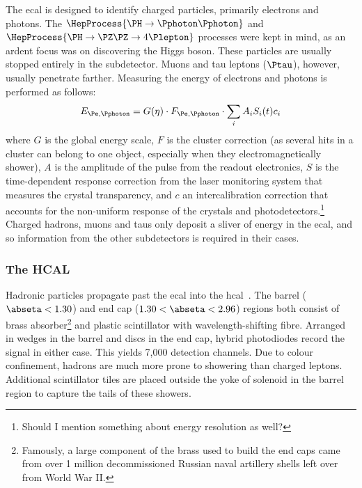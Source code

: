 The \acrshort{ecal} is designed to identify charged particles, primarily electrons and photons. The $\HepProcess{\PH \to \Pphoton\Pphoton}$ and $\HepProcess{\PH \to \PZ\PZ \to 4\Plepton}$ processes were kept in mind, as an ardent focus was on discovering the Higgs boson. These particles are usually stopped entirely in the subdetector. Muons and tau leptons ($\Ptau$), however, usually penetrate farther. Measuring the energy of electrons and photons is performed as follows:
\begin{equation}
    E_{\Pe, \Pphoton} = G(\eta) \cdot F_{\Pe, \Pphoton} \cdot \sum_i A_i S_i(t) c_i
    \label{eq:ecal_energy}
\end{equation}
where $G$ is the global energy scale, $F$ is the cluster correction (as several hits in a cluster can belong to one object, especially when they electromagnetically shower), $A$ is the amplitude of the pulse from the readout electronics, $S$ is the time-dependent response correction from the laser monitoring system that measures the crystal transparency, and $c$ an intercalibration correction that accounts for the non-uniform response of the crystals and photodetectors.\footnote{Should I mention something about energy resolution as well?} Charged hadrons, muons and taus only deposit a sliver of energy in the \acrshort{ecal}, and so information from the other subdetectors is required in their cases. 




\subsubsection{The HCAL}
\label{subsubsec:cms_hcal}

Hadronic particles propagate past the \acrshort{ecal} into the \acrshort{hcal}~\cite{CERN-LHCC-97-031}. The barrel ($\abseta < \text{1.30}$) and end cap ($\text{1.30} < \abseta < \text{2.96}$) regions both consist of brass absorber\footnote{Famously, a large component of the brass used to build the end caps came from over 1 million decommissioned Russian naval artillery shells left over from World War II.} and plastic scintillator with wavelength-shifting fibre. Arranged in wedges in the barrel and discs in the end cap, hybrid photodiodes record the signal in either case. This yields 7,000 detection channels. Due to colour confinement, hadrons are much more prone to showering than charged leptons. Additional scintillator tiles are placed outside the yoke of solenoid in the barrel region to capture the tails of these showers.

